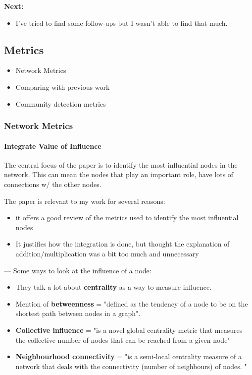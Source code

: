 \textbf{Next:}
\begin{itemize}
    \item I've tried to find some follow-ups but I wasn't able to find that much.
\end{itemize}


\subsection{Metrics}

\begin{itemize}
    \item Network Metrics
    \item Comparing with previous work
    \item Community detection metrics 
\end{itemize}

\subsubsection{Network Metrics}

\paragraph{Integrate Value of Influence}

The central focus of the paper is to identify the most influential nodes in the network. This can mean the nodes that play an important role, have lots of connections w/ the other nodes. 

The paper is relevant to my work for several reasons:
\begin{itemize}
    \item it offers a good review of the metrics used to identify the most influential nodes
    \item  It justifies how the integration is done, but thought the explanation of addition/multiplication was a bit too much and unnecessary
\end{itemize}

--- 
Some ways to look at the influence of a node: 

\begin{itemize}
    \item They talk a lot about \textbf{centrality} as a way to measure influence.
    \item Mention of \textbf{betweenness} = "defined as the tendency of a node to be on the shortest path between nodes in a graph".
    \item \textbf{Collective influence} =  "is a novel global centrality metric that measures the collective number of nodes that can be reached from a given node" 
    \item\textbf{ Neighbourhood connectivity} = "is a semi-local centrality measure of a network that deals with the connectivity (number of neighbours) of nodes. "

\end{itemize}

